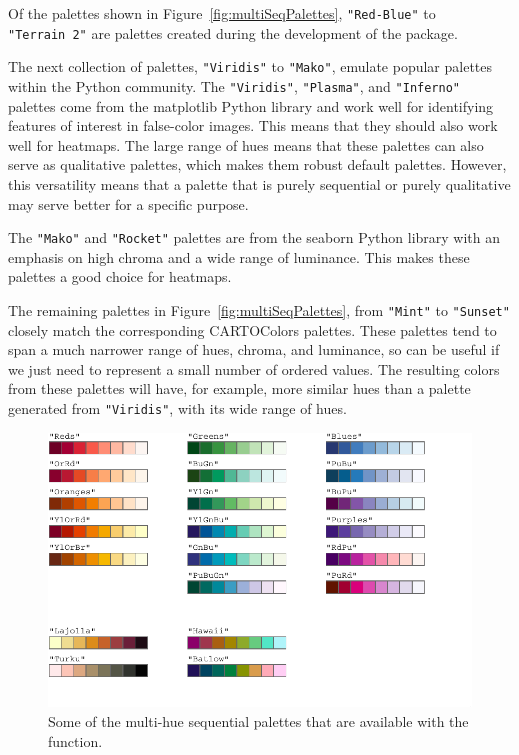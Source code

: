 Of the palettes shown in Figure~\ref{fig:multiSeqPalettes},
\texttt{"Red-Blue"} to \texttt{"Terrain\ 2"} are palettes created during the
development of the  package.

The next collection of palettes, \texttt{"Viridis"} to \texttt{"Mako"}, emulate
popular palettes within
the Python community.
The \texttt{"Viridis"}, \texttt{"Plasma"},
and \texttt{"Inferno"} palettes come from the matplotlib Python library
and work well for identifying features of interest in false-color images.
This means that they should also work well for heatmaps.
The large range of hues means that these palettes can also serve
as qualitative palettes, which makes them robust default palettes.
However, this versatility means that
a palette that is purely sequential or purely qualitative may serve better
for a specific purpose.

The \texttt{"Mako"} and \texttt{"Rocket"} palettes are from the seaborn Python
library with an emphasis on high chroma and a wide range of luminance.
This makes these palettes a good choice for heatmaps.

The remaining palettes in Figure~\ref{fig:multiSeqPalettes}, from
\texttt{"Mint"} to \texttt{"Sunset"} closely match the corresponding CARTOColors
palettes.
These palettes tend to span a much narrower range of hues, chroma,
and luminance, so can be useful if we just need to represent a
small number of ordered values.
The resulting colors from these palettes will have, for example,
more similar hues than a palette generated from \texttt{"Viridis"}, with
its wide range of hues.

\begin{figure}[ht!]

{\centering \includegraphics[width=1\linewidth]{color_files/figure-latex/multiSeqPalettes2-1} 

}

\caption{Some of the multi-hue sequential palettes that are available with the  function.}\label{fig:multiSeqPalettes2}
\end{figure}

